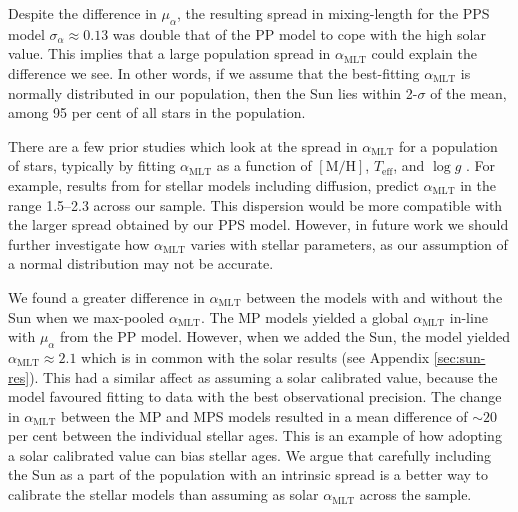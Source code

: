 \documentclass[a4paper,fleqn,usenatbib]{mnras}
\newcommand{\metallicity}{\ensuremath{[\mathrm{M}/\mathrm{H}]}}
\newcommand{\teff}{\ensuremath{T_\mathrm{eff}}}
\newcommand{\mlt}{\ensuremath{{\alpha_\mathrm{MLT}}}}
\begin{document}
Despite the difference in $\mu_\alpha$, the resulting spread in mixing-length for the PPS model $\sigma_\alpha \approx 0.13$ was double that of the PP model to cope with the high solar value. This implies that a large population spread in $\mlt$ could explain the difference we see. In other words, if we assume that the best-fitting $\mlt$ is normally distributed in our population, then the Sun lies within 2-$\sigma$ of the mean, among 95 per cent of all stars in the population. 

There are a few prior studies which look at the spread in $\mlt$ for a population of stars, typically by fitting $\mlt$ as a function of $\metallicity$, $\teff$, and $\log g$ \citep[e.g.][]{Bonaca.Tanner.ea2012,Viani.Basu.ea2018}. For example, results from \citet{Viani.Basu.ea2018} for stellar models including diffusion, predict $\mlt$ in the range \numrange{1.5}{2.3} across our sample. This dispersion would be more compatible with the larger spread obtained by our PPS model. However, in future work we should further investigate how $\mlt$ varies with stellar parameters, as our assumption of a normal distribution may not be accurate.

We found a greater difference in $\mlt$ between the models with and without the Sun when we max-pooled $\mlt$. The MP models yielded a global $\mlt$ in-line with $\mu_\alpha$ from the PP model. However, when we added the Sun, the model yielded $\mlt \approx 2.1$ which is in common with the solar results (see Appendix \ref{sec:sun-res}). This had a similar affect as assuming a solar calibrated value, because the model favoured fitting to data with the best observational precision. The change in $\mlt$ between the MP and MPS models resulted in a mean difference of $\sim 20$ per cent between the individual stellar ages. This is an example of how adopting a solar calibrated value can bias stellar ages. We argue that carefully including the Sun as a part of the population with an intrinsic spread is a better way to calibrate the stellar models than assuming as solar $\mlt$ across the sample.
\end{document}
